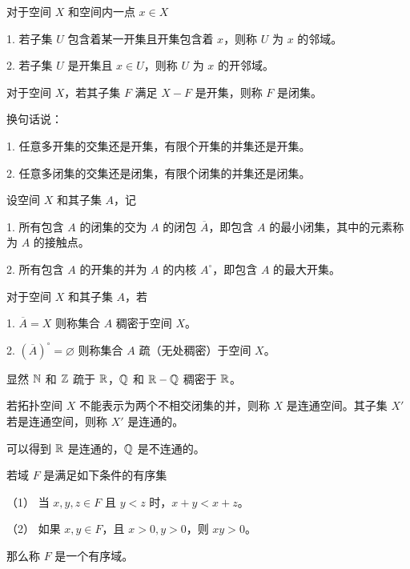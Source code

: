 \begin{definition}[邻域]
	对于空间 $X$ 和空间内一点 $x \in X$
	
	1. 若子集 $U$ 包含着某一开集且开集包含着 $x$，则称 $U$ 为 $x$ 的邻域。
	
	2. 若子集 $U$ 是开集且 $x \in U$，则称 $U$ 为 $x$ 的开邻域。
\end{definition}

\begin{definition}[闭集]
	对于空间 $X$，若其子集 $F$ 满足 $X-F$ 是开集，则称 $F$ 是闭集。
\end{definition}

\begin{example}
	换句话说：

	1. 任意多开集的交集还是开集，有限个开集的并集还是开集。

	2. 任意多闭集的交集还是闭集，有限个闭集的并集还是闭集。
\end{example}

\begin{definition}[闭包，内核]
	设空间 $X$ 和其子集 $A$，记
	
	1. 所有包含 $A$ 的闭集的交为 $A$ 的闭包 $\overline{A}$，即包含 $A$ 的最小闭集，其中的元素称为 $A$ 的接触点。

	2. 所有包含 $A$ 的开集的并为 $A$ 的内核 $A^{\circ}$，即包含 $A$ 的最大开集。
\end{definition}

\begin{definition}
	对于空间 $X$ 和其子集 $A$，若

	1. $\overline{A} = X$ 则称集合 $A$ 稠密于空间 $X$。
	
	2. $(\overline{A})^{\circ} = \varnothing$ 则称集合 $A$ 疏（无处稠密）于空间 $X$。
\end{definition}

显然 $\mathbb{N}$ 和 $\mathbb{Z}$ 疏于 $\mathbb{R}$，$\mathbb{Q}$ 和 $\mathbb{R} - \mathbb{Q}$ 稠密于 $\mathbb{R}$。

\begin{definition}[连通]
	若拓扑空间 $X$ 不能表示为两个不相交闭集的并，则称 $X$ 是连通空间。其子集 $X'$ 若是连通空间，则称 $X'$ 是连通的。
\end{definition}

可以得到 $\mathbb{R}$ 是连通的，$\mathbb{Q}$ 是不连通的。

\begin{definition}[有序域]
	若域 $F$ 是满足如下条件的有序集

	（1） 当 $x,y,z\in F$ 且 $y<z$ 时，$x+y<x+z$。

	（2） 如果 $x,y\in F$，且 $x>0,y>0$，则 $xy>0$。

	那么称 $F$ 是一个有序域。
\end{definition}

